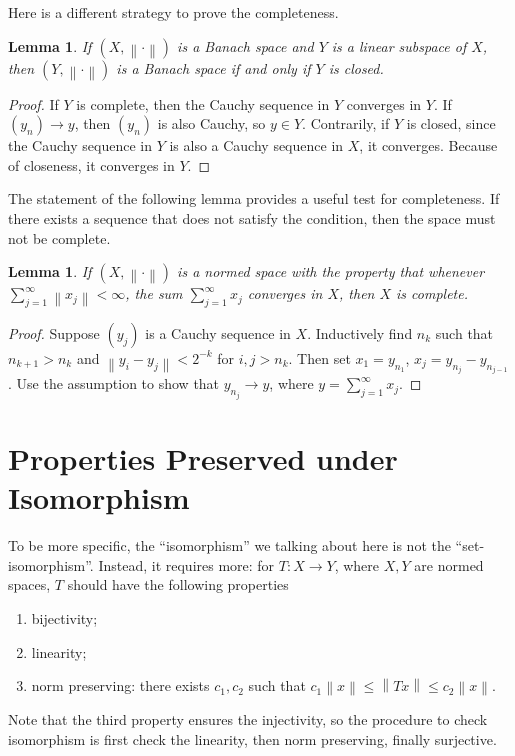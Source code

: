 \documentclass[12pt,a4paper]{article}
\numberwithin{equation}{section}
\theoremstyle{mystyle}
\newtheorem{lemma}[definition]{Lemma}
\newcommand{\norm}[1]{\left\lVert #1 \right\rVert}
\begin{document}
	Here is a different strategy to prove the completeness.
	\begin{lemma}
		If $(X,\norm{\cdot})$ is a Banach space and $Y$ is a linear subspace of $X$, then $(Y,\norm{\cdot})$ is a Banach space if and only if $Y$ is closed.
	\end{lemma}
	\begin{proof}
		If $Y$ is complete, then the Cauchy sequence in $Y$ converges in $Y$. If $(y_n)\to y$, then $(y_n)$ is also Cauchy, so $y\in Y$. Contrarily, if $Y$ is closed, since the Cauchy sequence in $Y$ is also a Cauchy sequence in $X$, it converges. Because of closeness, it converges in $Y$.
	\end{proof}
	The statement of the following lemma provides a useful test for completeness. If there exists a sequence that does not satisfy the condition, then the space must not be complete.
	\begin{lemma}
		If $(X,\norm{\cdot})$ is a normed space with the property that whenever $\sum_{j=1}^\infty \norm{x_j}<\infty$, the sum $\sum_{j=1}^\infty x_j$ converges in $X$, then $X$ is complete.
	\end{lemma}
	\begin{proof}
		Suppose $(y_j)$ is a Cauchy sequence in $X$. Inductively find $n_k$ such that $n_{k+1}>n_k$ and $\norm{y_i-y_j}<2^{-k}$ for $i,j>n_k$. Then set $x_1=y_{n_1}$, $x_j=y_{n_j}-y_{n_{j-1}}$. Use the assumption to show that $y_{n_j}\to y$, where $y=\sum_{j=1}^\infty x_j$.
	\end{proof}

	\section{Properties Preserved under Isomorphism}
	To be more specific, the ``isomorphism'' we talking about here is not the ``set-isomorphism''. Instead, it requires more: for $T:X\to Y$, where $X,Y$ are normed spaces, $T$ should have the following properties
	\begin{enumerate}
		\item bijectivity;
		\item linearity;
		\item norm preserving: there exists $c_1,c_2$ such that $c_1\norm{x}\leq \norm{Tx}\leq c_2\norm{x}$.
	\end{enumerate}
	Note that the third property ensures the injectivity, so the procedure to check isomorphism is first check the linearity, then norm preserving, finally surjective.
	
\end{document}
